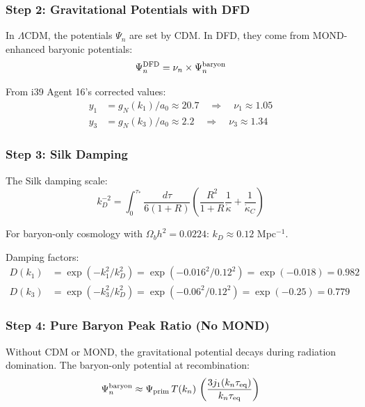 \documentclass[11pt,a4paper]{article}
\begin{document}
\subsubsection{Step 2: Gravitational Potentials with DFD}

In $\Lambda$CDM, the potentials $\Psi_n$ are set by CDM. In DFD, they come from MOND-enhanced baryonic potentials:
\begin{equation}
\Psi_n^{\rm DFD} = \nu_n \times \Psi_n^{\rm baryon}
\end{equation}

From i39 Agent 16's corrected values:
\begin{align}
y_1 &= g_N(k_1)/a_0 \approx 20.7 \quad \Rightarrow \quad \nu_1 \approx 1.05 \\
y_3 &= g_N(k_3)/a_0 \approx 2.2 \quad \Rightarrow \quad \nu_3 \approx 1.34
\end{align}

\subsubsection{Step 3: Silk Damping}

The Silk damping scale:
\begin{equation}
k_D^{-2} = \int_0^{\tau_*}\frac{d\tau}{6(1+R)}\left(\frac{R^2}{1+R}\frac{1}{\dot{\kappa}} + \frac{1}{\dot{\kappa}_C}\right)
\end{equation}

For baryon-only cosmology with $\Omega_b h^2 = 0.0224$:
$k_D \approx 0.12$ Mpc$^{-1}$.

Damping factors:
\begin{align}
D(k_1) &= \exp(-k_1^2/k_D^2) = \exp(-0.016^2/0.12^2) = \exp(-0.018) = 0.982 \\
D(k_3) &= \exp(-k_3^2/k_D^2) = \exp(-0.06^2/0.12^2) = \exp(-0.25) = 0.779
\end{align}

\subsubsection{Step 4: Pure Baryon Peak Ratio (No MOND)}

Without CDM or MOND, the gravitational potential decays during radiation domination. The baryon-only potential at recombination:
\begin{equation}
\Psi^{\rm baryon}_n \approx \Psi_{\rm prim}\,T(k_n)\,\left(\frac{3j_1(k_n\tau_{\rm eq})}{k_n\tau_{\rm eq}}\right)
\end{equation}
\end{document}
